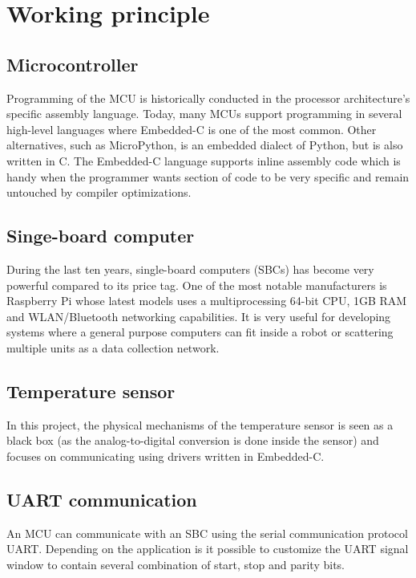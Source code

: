 \section{Working principle}%
\label{sec:working_principle}

\subsection{Microcontroller}%
\label{sub:microcontroller}
Programming of the MCU is historically conducted in the processor architecture's specific assembly language. Today, many MCUs support programming in several high-level languages where Embedded-C is one of the most common. Other alternatives, such as MicroPython, is an embedded dialect of Python, but is also written in C. The Embedded-C language supports inline assembly code which is handy when the programmer wants section of code to be very specific and remain untouched by compiler optimizations.

\subsection{Singe-board computer}%
\label{sub:singe_board_computer}
During the last ten years, single-board computers (SBCs) has become very powerful compared to its price tag. One of the most notable manufacturers is Raspberry Pi whose latest models uses a multiprocessing 64-bit CPU, 1GB RAM and WLAN/Bluetooth networking capabilities. It is very useful for developing systems where a general purpose computers can fit inside a robot or scattering multiple units as a data collection network. 

\subsection{Temperature sensor}%
\label{sub:temperature_sensor}
In this project, the physical mechanisms of the temperature sensor is seen as a black box (as the analog-to-digital conversion is done inside the sensor) and focuses on communicating using drivers written in Embedded-C.

\subsection{UART communication}%
\label{sub:uart}
An MCU can communicate with an SBC using the serial communication protocol UART. Depending on the application is it possible to customize the UART signal window to contain several combination of start, stop and parity bits.


